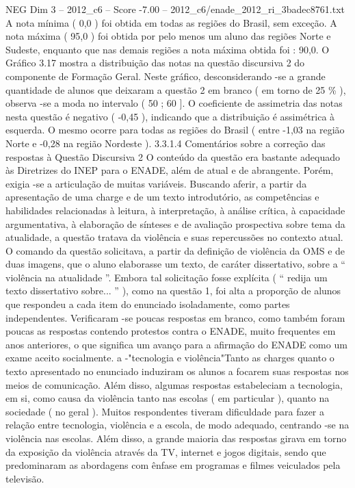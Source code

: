 \begin{textsample}{NEG Dim 3 – 2012\_c6 – Score -7.00 – 2012\_c6/enade\_2012\_ri\_3badec8761.txt}
A nota mínima ( 0,0 ) foi obtida em todas as regiões do Brasil, sem exceção.
A nota máxima ( 95,0 ) foi obtida por pelo menos um aluno das regiões Norte e Sudeste, enquanto que nas demais regiões a nota máxima obtida foi : 90,0.
O Gráfico 3.17 mostra a distribuição das notas na questão discursiva 2 do componente de Formação Geral.
Neste gráfico, desconsiderando -se a grande quantidade de alunos que deixaram a questão 2 em branco ( em torno de 25 \% ), observa -se a moda no intervalo ( 50 ; 60 ].
O coeficiente de assimetria das notas nesta questão é negativo ( -0,45 ), indicando que a distribuição é assimétrica à esquerda.
O mesmo ocorre para todas as regiões do Brasil ( entre -1,03 na região Norte e -0,28 na região Nordeste ). 3.3.1.4 Comentários sobre a correção das respostas à Questão Discursiva 2 O conteúdo da questão era bastante adequado às Diretrizes do INEP para o ENADE, além de atual e de abrangente.
Porém, exigia -se a articulação de muitas variáveis.
Buscando aferir, a partir da apresentação de uma charge e de um texto introdutório, as competências e habilidades relacionadas à leitura, à interpretação, à análise crítica, à capacidade argumentativa, à elaboração de sínteses e de avaliação prospectiva sobre tema da atualidade, a questão tratava da violência e suas repercussões no contexto atual.
O comando da questão solicitava, a partir da definição de violência da OMS e de duas imagens, que o aluno elaborasse um texto, de caráter dissertativo, sobre a “ violência na atualidade ”.
Embora tal solicitação fosse explícita ( “ redija um texto dissertativo sobre... ” ), como na questão 1, foi alta a proporção de alunos que respondeu a cada item do enunciado isoladamente, como partes independentes.
Verificaram -se poucas respostas em branco, como também foram poucas as respostas contendo protestos contra o ENADE, muito frequentes em anos anteriores, o que significa um avanço para a afirmação do ENADE como um exame aceito socialmente. a -"tecnologia e violência"Tanto as charges quanto o texto apresentado no enunciado induziram os alunos a focarem suas respostas nos meios de comunicação.
Além disso, algumas respostas estabeleciam a tecnologia, em si, como causa da violência tanto nas escolas ( em particular ), quanto na sociedade ( no geral ).
Muitos respondentes tiveram dificuldade para fazer a relação entre tecnologia, violência e a escola, de modo adequado, centrando -se na violência nas escolas.
Além disso, a grande maioria das respostas girava em torno da exposição da violência através da TV, internet e jogos digitais, sendo que predominaram as abordagens com ênfase em programas e filmes veiculados pela televisão.

\end{textsample}
